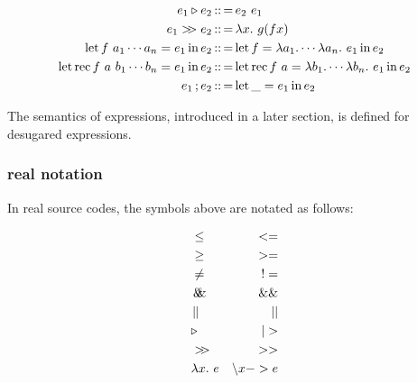 \begin{align*}
        e_1 \triangleright e_2 &\defeq e_2\ e_1 \\
        e_1 \composition e_2 &\defeq \abs{x}{g (f x)}\\
        \letStructure{f\ a_{1} \cdots a_n}{e_1}{e_2}&\defeq
            \letStructure{f}{\lambda a_1 . \cdots \lambda a_n.\ {e_1}}{e_2}\\
        \letRecStructure{f}{a\ b_{1} \cdots b_n}{e_1}{e_2}&\defeq
            \letRecStructure{f}{a}{\lambda b_1 . \cdots \lambda b_n.\ {e_1}}{e_2}\\
        e_1\opCol{}e_2 &\defeq \letStructure{\_}{e_1}{e_2}
\end{align*}

The semantics of expressions, introduced in a later section, is defined for desugared expressions.

\subsubsection{real notation}

In real source codes, the symbols above are notated as follows:

\begin{align*}
    &\leq & <=\\
    &\geq & >=\\
    &\not= & !=\\
    &\logAnd & \&\&\\
    &\logOr & ||\\
    &\triangleright & |>\\
    &\composition & >>\\
    &\abs{x}{e} & \backslash x -> e
\end{align*}
